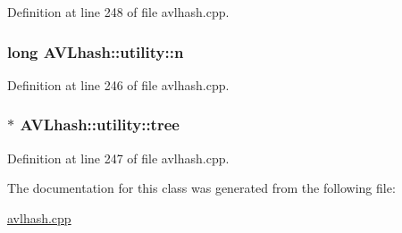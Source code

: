 Definition at line 248 of file avlhash.\-cpp.

\hypertarget{class_a_v_lhash_1_1utility_a92cdca8dcb09556c54de4b15c234aba5}{
\subsubsection[{n}]{\setlength{\rightskip}{0pt plus 5cm}long A\-V\-Lhash\-::utility\-::n}}\label{class_a_v_lhash_1_1utility_a92cdca8dcb09556c54de4b15c234aba5}


Definition at line 246 of file avlhash.\-cpp.

\hypertarget{class_a_v_lhash_1_1utility_a735e7f8e4ac69c221cbdf73fe52fd3a1}{
\subsubsection[{tree}]{$\ast$ A\-V\-Lhash\-::utility\-::tree}}\label{class_a_v_lhash_1_1utility_a735e7f8e4ac69c221cbdf73fe52fd3a1}


Definition at line 247 of file avlhash.\-cpp.



The documentation for this class was generated from the following file\-:\begin{DoxyCompactItemize}
\item 
\hyperlink{avlhash_8cpp}{avlhash.\-cpp}\end{DoxyCompactItemize}
